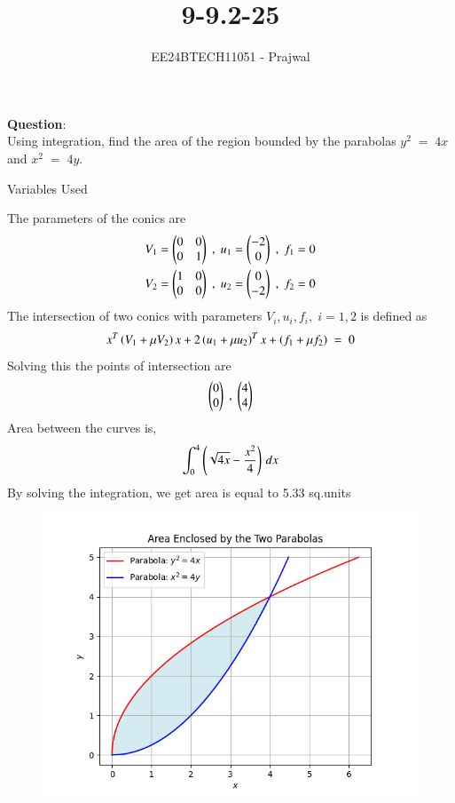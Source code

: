 \documentclass[journal]{IEEEtran}
\begin{document}

\vspace{3cm}

\title{9-9.2-25}
\author{EE24BTECH11051 - Prajwal}
{\let\newpage\relax\maketitle}

\renewcommand{\thefigure}{\theenumi}
\renewcommand{\thetable}{\theenumi}
\setlength{\intextsep}{10pt} %


\renewcommand{\thetable}{\theenumi}
\textbf{Question}:\\
Using integration, find the area of the region bounded by the parabolas $y^2\;=\;4x$ and  $x^2\;=\;4y$.
\\
\solution
\begin{table}[h!]    
  \centering
  
  \caption{Variables Used}
  \label{tab1-1.2-20}
\end{table}
The parameters of the conics are
\begin{align}
V_1=\begin{pmatrix}0 & 0 \\ 0 & 1\end{pmatrix}\;,\;u_1=\begin{pmatrix}-2\\0\end{pmatrix} \;,\;f_1=0\\
V_2=\begin{pmatrix}1 & 0 \\ 0 & 0\end{pmatrix}\;,\;u_2=\begin{pmatrix}0\\-2\end{pmatrix}\;,\;f_2=0
\end{align}
The intersection of two conics with parameters $V_i,u_i,f_i,\;i= 1,2$ is defined as
\begin{align}
x^T\left(V_1+\mu V_2\right)x+2\left(u_1+\mu u_2\right)^T x + \left(f_1+\mu f_2\right)\;=\;0
\end{align}
Solving this the points of intersection are
\begin{align}
\begin{pmatrix}0\\0\end{pmatrix}\;,\;\begin{pmatrix}4\\4\end{pmatrix}
\end{align}
Area between the curves is,
\begin{align}
\int_{0}^{4} \left(\sqrt{4x}-\frac{x^2}{4}\right) \, dx 
\end{align}
By solving the integration, we get area is equal to 5.33 sq.units
\begin{figure}[h!]
   \centering
   \includegraphics[width=\linewidth]{figs/Figure_1.png}
   \label{stemplot}
   \caption{}
\end{figure}
\end{document}
